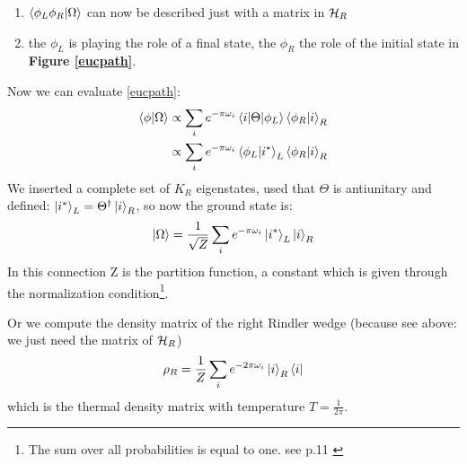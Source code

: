 		\begin{enumerate}
			\item $\braket{\phi_L \phi_R| \Omega}$ can now be described just with a matrix in $\mathcal{H}_R$
			\item the $\phi_L$ is playing the role of a final state, the $\phi_R$ the role of the initial state in \textbf{Figure \ref{eucpath}}.
		\end{enumerate}
	Now we can evaluate \eqref{eucpath}:
	\begin{align}
		\braket{\phi|\Omega} &\propto \sum_i e^{-\pi \omega_i} \braket{i | \Theta | \phi_L} \braket{\phi_R|i}_R \nonumber\\
		&\propto \sum_i e^{-\pi \omega_i} \braket{\phi_L| i^*}_L\braket{\phi_R|i}_R
	\end{align} %
	We inserted a complete set of  $K_R$ eigenstates, used that $\Theta$ is antiunitary and defined: $\ket{i^*}_L = \Theta^\dagger \ket{i}_R$, so now the ground state is:
	\begin{align} \label{groundstate}
		\ket{\Omega} = \frac{1}{\sqrt{Z}} \sum_i  e^{-\pi \omega_i} \ket{i^*}_L \ket{i}_R 
	\end{align}
	In this connection Z is the partition function, a constant which is given through the normalization condition\footnote{The sum over all probabilities is equal to one. see p.11 \cite{Brenig}}. 
	
	Or we compute the density matrix of the right Rindler wedge (because see above: we just need the matrix of $\mathcal{H}_R$)
	\begin{align}
		\rho_R= \frac{1}{Z} \sum_i e^{-2\pi\omega_i} \ket{i}_R \bra{i}
	\end{align}
	which is the thermal density matrix with temperature $T=\frac{1}{2\pi}$. 
